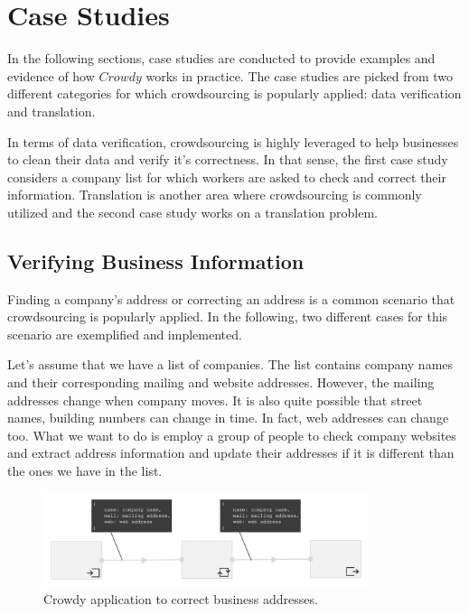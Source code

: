 \chapter{Case Studies}
\label{chap:examples}

In the following sections, case studies are conducted to provide examples 
and evidence of how $Crowdy$ works in practice. The case studies are picked from 
two different categories for which crowdsourcing is popularly applied: data verification 
and translation.

In terms of data verification, crowdsourcing is highly leveraged to help businesses 
to clean their data and verify it's correctness. In that sense, the first case study considers 
a company list for which workers are asked to check and correct their information. Translation 
is another area where crowdsourcing is commonly utilized and the second case study 
works on a translation problem.  

\section{Verifying Business Information}
Finding a company's address or correcting an address is a common scenario that crowdsourcing is popularly applied. In the following, two different cases for this scenario are exemplified and implemented.

Let's assume that we have a list of companies. The list contains company names and their corresponding mailing and website addresses. However, the mailing addresses change when company moves. It is also quite possible that street names, building numbers can change in time. In fact, web addresses can change too. What we want to do is employ a group of people to check company websites and extract address information and update their addresses if it is different than the ones we have in the list.

\begin{figure}[ht]
	\centering
	\includegraphics[width=0.85\textwidth]{figures/scenarios/scenario1_1a.png}
	\caption{Crowdy application to correct business addresses.}
	\label{fig:scenario1}
\end{figure}

